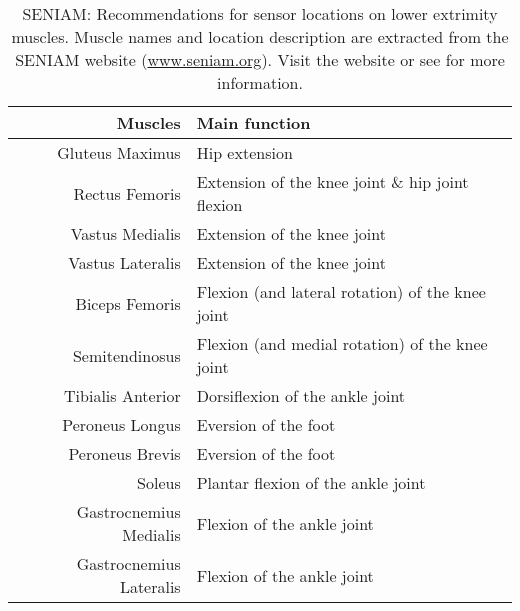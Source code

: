 \begin{table}[ht!]
    \centering
    \caption{\ac{SENIAM}: Recommendations for sensor locations on lower extrimity muscles. Muscle names and location description are extracted from the \ac{SENIAM} website (\href{www.seniam.org}{www.seniam.org}). Visit the website or see \cite{Hermens1999} for more information.}
    \label{tab:muscle-names}
    \small
    \begin{tabular}{r | l} %
        Muscles                                 & Main function \\ \hline
        Gluteus Maximus                         & Hip extension \\
        Rectus Femoris                          & Extension of the knee joint \& hip joint flexion\\
        Vastus Medialis                         & Extension of the knee joint\\
        Vastus Lateralis                        & Extension of the knee joint\\
        Biceps Femoris                          & Flexion (and lateral rotation) of the knee joint\\
        Semitendinosus                          & Flexion (and medial rotation) of the knee joint\\
        Tibialis Anterior                       & Dorsiflexion of the ankle joint \\
        Peroneus Longus                         & Eversion of the foot\\
        Peroneus Brevis                         & Eversion of the foot\\
        Soleus                                  & Plantar flexion of the ankle joint\\
        Gastrocnemius Medialis                  & Flexion of the ankle joint\\
        Gastrocnemius Lateralis                 & Flexion of the ankle joint
    \end{tabular}
\end{table}
